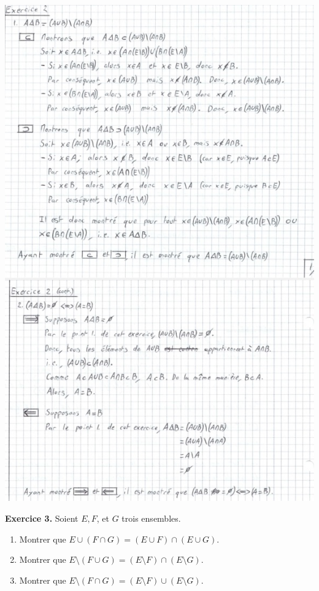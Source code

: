 \documentclass[a4paper, 10pt]{report}
\begin{document}
	\includegraphics[scale=0.8]{02B - ex02.jpg}
	
	\newpage

	\noindent
	\textbf{Exercice 3.} Soient $E, F$, et $G$ trois ensembles.
	
	\begin{enumerate}[label=\arabic*.]
		\item Montrer que $E \cup (F \cap G)
			= (E \cup F) \cap (E \cup G)$.
		\item Montrer que $E \setminus (F \cup G)
			= (E \setminus F) \cap (E \setminus G)$.
		\item Montrer que $E \setminus (F \cap G)
		= (E \setminus F) \cup (E \setminus G)$.
	\end{enumerate}
	
\end{document}
